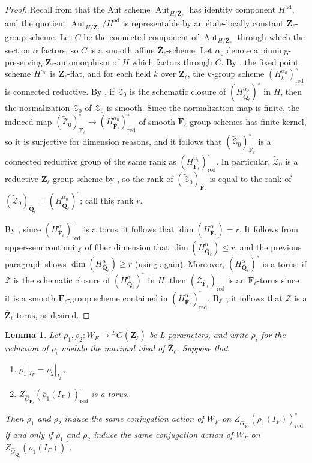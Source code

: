 \documentclass[reqno]{amsart}
\numberwithin{equation}{subsection}
\newcommand{\F}{\mathbf{F}}
\newcommand{\wt}[1]{\widetilde{#1}}
\newcommand{\Q}{\mathbf{Q}}
\newcommand{\Z}{\mathbf{Z}}
\newcommand{\ol}[1]{\overline{#1}}
\newcommand{\wh}[1]{\widehat{#1}}
\newcommand{\co}{\colon}
\newcommand{\ld}{{}^L}
\newcommand\cZ{\mathcal{Z}}
\DeclareMathOperator{\Aut}{Aut}
\DeclareMathOperator{\ad}{ad}
\DeclareMathOperator{\red}{red}
\newtheorem{lemma}[thm]{Lemma}
\theoremstyle{remark}
\numberwithin{equation}{subsection}
\numberwithin{figure}{subsection}
\begin{document}
\begin{proof}
Recall from \cite[Theorem 7.1.9]{Con14} that the Aut scheme $\Aut_{H/\ol\Z_\ell}$ has identity component $H^{\ad}$, and the quotient $\Aut_{H/\ol\Z_\ell}/H^{\ad}$ is representable by an \'etale-locally constant $\ol\Z_\ell$-group scheme. Let $C$ be the connected component of $\Aut_{H/\ol\Z_\ell}$ through which the section $\alpha$ factors, so $C$ is a smooth affine $\ol\Z_\ell$-scheme. Let $\alpha_0$ denote a pinning-preserving $\ol\Z_\ell$-automorphism of $H$ which factors through $C$. By \cite[Theorem 1.1(1), (4)]{ALRR22}, the fixed point scheme $H^{\alpha_0}$ is $\ol\Z_\ell$-flat, and for each field $k$ over $\ol\Z_\ell$, the $k$-group scheme $(H^{\alpha_0}_k)^\circ_{\red}$ is connected reductive. By \cite[Proposition 3.4]{PY06}, if $\cZ_0$ is the schematic closure of $(H^{\alpha_0}_{\ol\Q_\ell})^\circ$ in $H$, then the normalization $\wt\cZ_0$ of $\cZ_0$ is smooth. Since the normalization map is finite, the induced map $(\wt\cZ_0)_{\ol\F_\ell}^\circ \to (H^{\alpha_0}_{\ol\F_\ell})^\circ_{\red}$ of smooth $\ol\F_\ell$-group schemes has finite kernel, so it is surjective for dimension reasons, and it follows that $(\wt\cZ_0)_{\ol\F_\ell}^\circ$ is a connected reductive group of the same rank as $(H^{\alpha_0}_{\ol\F_\ell})^\circ_{\red}$. In particular, $\wt\cZ_0$ is a reductive $\ol\Z_\ell$-group scheme by \cite[Proposition 3.1.3]{Con14}, so the rank of $(\wt\cZ_0)_{\ol\F_\ell}$ is equal to the rank of $(\wt\cZ_0)_{\ol\Q_\ell} = (H^{\alpha_0}_{\ol\Q_\ell})^\circ$; call this rank $r$.

By \cite[Remark 5.2.2(1)]{XZ19}, since $(H^\alpha_{\ol\F_\ell})^\circ_{\red}$ is a torus, it follows that $\dim(H^\alpha_{\ol\F_\ell}) = r$. It follows from upper-semicontinuity of fiber dimension that $\dim(H^\alpha_{\ol\Q_\ell}) \leq r$, and the previous paragraph shows $\dim(H^\alpha_{\ol\Q_\ell}) \geq r$ (using \cite[Remark 5.2.2(1)]{XZ19} again). Moreover, $(H^\alpha_{\ol\Q_\ell})^\circ$ is a torus: if $\cZ$ is the schematic closure of $(H^\alpha_{\ol\Q_\ell})^\circ$ in $H$, then $(\cZ_{\ol\F_\ell})^\circ_{\red}$ is an $\ol\F_\ell$-torus since it is a smooth $\ol\F_\ell$-group scheme contained in $(H^\alpha_{\ol\F_\ell})^\circ_{\red}$. By \cite[Expos\'e X, Th\'eor\`eme 8.8]{SGA3II}, it follows that $\cZ$ is a $\ol\Z_\ell$-torus, as desired.
\end{proof}

\begin{lemma}\label{lemma:torus-action-mod-ell}
Let $\rho_1, \rho_2 \co W_F \to \ld G(\ol\Z_\ell)$ be L-parameters, and write $\ol\rho_i$ for the reduction of $\rho_i$ modulo the maximal ideal of $\ol\Z_\ell$. Suppose that
\begin{enumerate}
\item $\rho_1|_{I_F} = \rho_2|_{I_F}$,
\item $Z_{\wh G_{\ol\F_\ell}}(\ol\rho_1(I_F))^\circ_{\red}$ is a torus.
\end{enumerate} 
Then $\ol\rho_1$ and $\ol\rho_2$ induce the same conjugation action of $W_F$ on $Z_{\wh G_{\ol\F_\ell}}(\ol\rho_1(I_F))^\circ_{\red}$ if and only if $\rho_1$ and $\rho_2$ induce the same conjugation action of $W_F$ on $Z_{\wh G_{\ol\Q_\ell}}(\rho_1(I_F))^\circ$.
\end{lemma}
\end{document}
